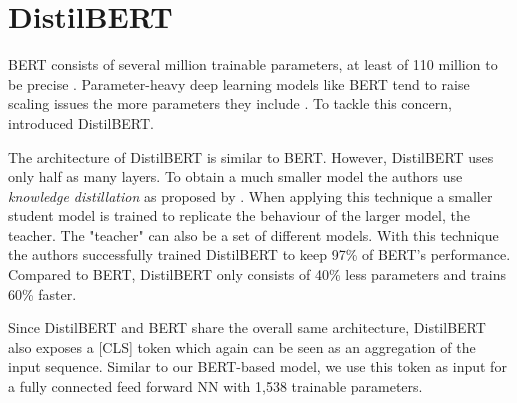 \section{DistilBERT}
\label{chp:approach:sec:distilbert}

\Ac{BERT} consists of several million trainable parameters, at least of 110 million to be precise \parencite{Devlin:2018}.
Parameter-heavy deep learning models like \ac{BERT} tend to raise scaling issues the more parameters they include \parencite{Schwartz:2019}.
To tackle this concern, \textcite{Sanh:2019} introduced \acl{DistilBERT}.

The architecture of \ac{DistilBERT} is similar to \ac{BERT}.
However, \ac{DistilBERT} uses only half as many layers.
To obtain a much smaller model the authors use \textit{knowledge distillation} as proposed by \textcites{Bucilua:2006}{Hinton:2015}.
When applying this technique a smaller student model is trained to replicate the behaviour of the larger model, the teacher.
The "teacher" can also be a set of different models.
With this technique the authors successfully trained \ac{DistilBERT} to keep 97\% of \ac{BERT}'s performance.
Compared to \ac{BERT}, \ac{DistilBERT} only consists of 40\% less parameters and trains 60\% faster. \parencite{Sanh:2019}

Since \ac{DistilBERT} and \ac{BERT} share the overall same architecture, \ac{DistilBERT} also exposes a [CLS] token which again can be seen as an aggregation of the input sequence.
Similar to our \ac{BERT}-based model, we use this token as input for a fully connected feed forward \ac{NN} with 1,538 trainable parameters.
